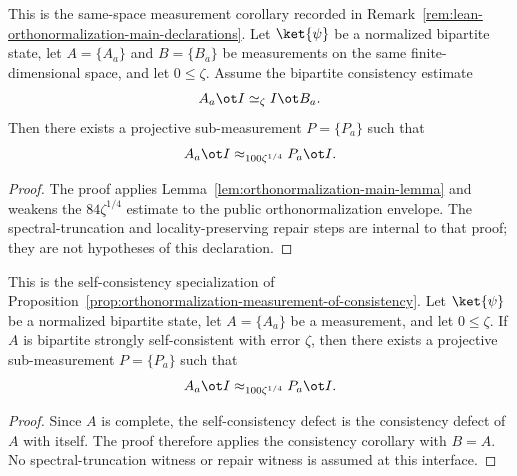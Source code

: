 \begin{proposition}\label{prop:orthonormalization-measurement-of-consistency}
	\leanok
	This is the same-space measurement corollary recorded in
	Remark~\ref{rem:lean-orthonormalization-main-declarations}.  Let
	\(\ket{\psi}\) be a normalized bipartite state, let \(A=\{A_a\}\) and
	\(B=\{B_a\}\) be measurements on the same finite-dimensional space, and
	let \(0 \leq \zeta\).  Assume the bipartite consistency estimate
	\[
		A_a \ot I \simeq_{\zeta} I \ot B_a .
	\]
	Then there exists a projective sub-measurement \(P=\{P_a\}\) such that
	\[
		A_a \ot I \approx_{100\zeta^{1/4}} P_a \ot I .
	\]
\end{proposition}
\begin{proof}
	\leanok
	The proof applies Lemma~\ref{lem:orthonormalization-main-lemma} and weakens
	the \(84\zeta^{1/4}\) estimate to the public orthonormalization envelope.
	The spectral-truncation and locality-preserving repair steps are internal to
	that proof; they are not hypotheses of this declaration.
\end{proof}

\begin{proposition}\label{prop:orthonormalization-measurement}
	\leanok
	This is the self-consistency specialization of
	Proposition~\ref{prop:orthonormalization-measurement-of-consistency}.
	Let \(\ket{\psi}\) be a normalized bipartite state, let \(A=\{A_a\}\) be a
	measurement, and let \(0\leq\zeta\).  If \(A\) is bipartite strongly
	self-consistent with error \(\zeta\), then there exists a projective
	sub-measurement \(P=\{P_a\}\) such that
	\[
		A_a \ot I \approx_{100 \zeta^{1/4}} P_a \ot I.
	\]
\end{proposition}
\begin{proof}
	\leanok
	Since \(A\) is complete, the self-consistency defect is the consistency
	defect of \(A\) with itself.  The proof therefore applies the consistency
	corollary with \(B=A\).  No spectral-truncation witness or repair witness is
	assumed at this interface.
\end{proof}

